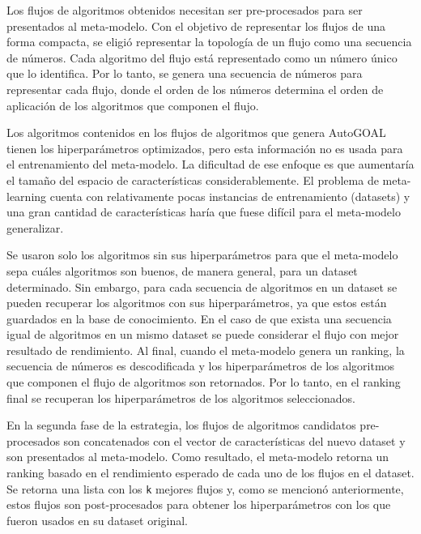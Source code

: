 Los flujos de algoritmos obtenidos necesitan ser pre-procesados para ser presentados al meta-modelo. Con el objetivo de representar los flujos de una forma compacta, se eligió representar la topología de un flujo como una secuencia de números. Cada algoritmo del flujo está representado como un número único que lo identifica. Por lo tanto, se genera una secuencia de números para representar cada flujo, donde el orden de los números determina el orden de aplicación de los algoritmos que componen el flujo.

Los algoritmos contenidos en los flujos de algoritmos que genera AutoGOAL tienen los hiperparámetros optimizados, pero esta información no es usada para el entrenamiento del meta-modelo. La dificultad de ese enfoque es que aumentaría el tamaño del espacio de características considerablemente. El problema de meta-learning cuenta con relativamente pocas instancias de entrenamiento (datasets) y una gran cantidad de características haría que fuese difícil para el meta-modelo generalizar.

Se usaron solo los algoritmos sin sus hiperparámetros para que el meta-modelo sepa cuáles algoritmos son buenos, de manera general, para un dataset determinado. Sin embargo, para cada secuencia de algoritmos en un dataset se pueden recuperar los algoritmos con sus hiperparámetros, ya que estos están guardados en la base de conocimiento. En el caso de que exista una secuencia igual de algoritmos en un mismo dataset se puede considerar el flujo con mejor resultado de rendimiento. Al final, cuando el meta-modelo genera un ranking, la secuencia de números es descodificada y los hiperparámetros de los algoritmos que componen el flujo de algoritmos son retornados. Por lo tanto, en el ranking final se recuperan los hiperparámetros de los algoritmos seleccionados.

En la segunda fase de la estrategia, los flujos de algoritmos candidatos pre-procesados son concatenados con el vector de características del nuevo dataset y son presentados al meta-modelo. Como resultado, el meta-modelo retorna un ranking basado en el rendimiento esperado de cada uno de los flujos en el dataset. Se retorna una lista con los \texttt{k} mejores flujos y, como se mencionó anteriormente, estos flujos son post-procesados para obtener los hiperparámetros con los que fueron usados en su dataset original.


